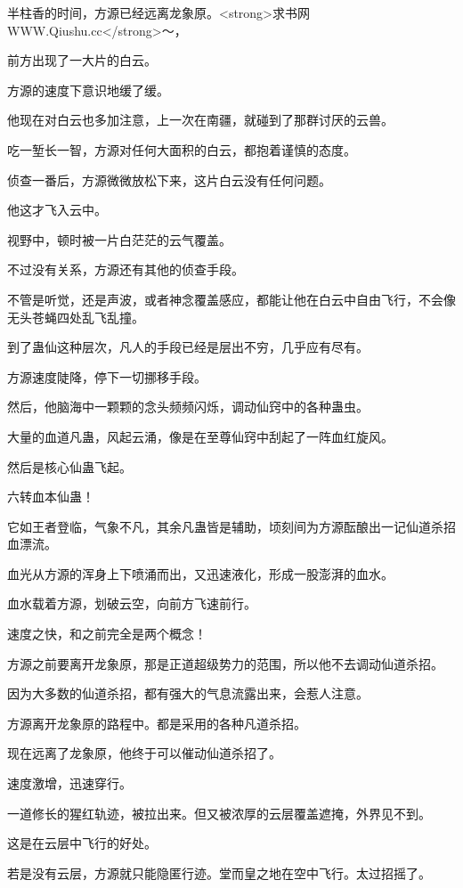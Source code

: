 
\begin{this_body}

半柱香的时间，方源已经远离龙象原。<strong>求书网WWW.Qiushu.cc</strong>～，

前方出现了一大片的白云。

方源的速度下意识地缓了缓。

他现在对白云也多加注意，上一次在南疆，就碰到了那群讨厌的云兽。

吃一堑长一智，方源对任何大面积的白云，都抱着谨慎的态度。

侦查一番后，方源微微放松下来，这片白云没有任何问题。

他这才飞入云中。

视野中，顿时被一片白茫茫的云气覆盖。

不过没有关系，方源还有其他的侦查手段。

不管是听觉，还是声波，或者神念覆盖感应，都能让他在白云中自由飞行，不会像无头苍蝇四处乱飞乱撞。

到了蛊仙这种层次，凡人的手段已经是层出不穷，几乎应有尽有。

方源速度陡降，停下一切挪移手段。

然后，他脑海中一颗颗的念头频频闪烁，调动仙窍中的各种蛊虫。

大量的血道凡蛊，风起云涌，像是在至尊仙窍中刮起了一阵血红旋风。

然后是核心仙蛊飞起。

六转血本仙蛊！

它如王者登临，气象不凡，其余凡蛊皆是辅助，顷刻间为方源酝酿出一记仙道杀招血漂流。

血光从方源的浑身上下喷涌而出，又迅速液化，形成一股澎湃的血水。

血水载着方源，划破云空，向前方飞速前行。

速度之快，和之前完全是两个概念！

方源之前要离开龙象原，那是正道超级势力的范围，所以他不去调动仙道杀招。

因为大多数的仙道杀招，都有强大的气息流露出来，会惹人注意。

方源离开龙象原的路程中。都是采用的各种凡道杀招。

现在远离了龙象原，他终于可以催动仙道杀招了。

速度激增，迅速穿行。

一道修长的猩红轨迹，被拉出来。但又被浓厚的云层覆盖遮掩，外界见不到。

这是在云层中飞行的好处。

若是没有云层，方源就只能隐匿行迹。堂而皇之地在空中飞行。太过招摇了。


\end{this_body}
